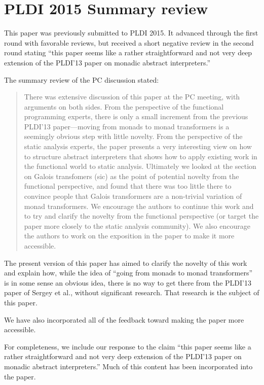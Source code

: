 \documentclass[nocopyrightspace,preprint,10pt]{sigplanconf}
\begin{document}
\balance



\appendix
\section{PLDI 2015 Summary review}

This paper was previously submitted to PLDI 2015. It advanced through
the first round with favorable reviews, but received a short negative
review in the second round stating ``this paper seems like a rather
straightforward and not very deep extension of the PLDI'13 paper on
monadic abstract interpreters.''

The summary review of the PC discussion stated:

\begin{quote}
There was extensive discussion of this paper at the PC meeting, with
arguments on both sides. From the perspective of the functional
programming experts, there is only a small increment from the previous
PLDI'13 paper---moving from monads to monad transformers is a
seemingly obvious step with little novelty. From the perspective of
the static analysis experts, the paper presents a very interesting
view on how to structure abstract interpreters that shows how to apply
existing work in the functional world to static analysis. Ultimately
we looked at the section on Galois transfomers (sic) as the point of
potential novelty from the functional perspective, and found that
there was too little there to convince people that Galois transformers
are a non-trivial variation of monad transformers. We encourage the
authors to continue this work and to try and clarify the novelty from
the functional perspective (or target the paper more closely to the
static analysis community). We also encourage the authors to work on
the exposition in the paper to make it more accessible.
\end{quote}

The present version of this paper has aimed to clarify the novelty of
this work and explain how, while the idea of ``going from monads to
monad transformers'' is in some sense an obvious idea, there is no way
to get there from the PLDI'13 paper of Sergey et al., without
significant research.  That research is the subject of this paper.

We have also incorporated all of the feedback toward making the paper
more accessible.

For completeness, we include our response to the claim ``this paper
seems like a rather straightforward and not very deep extension of the
PLDI'13 paper on monadic abstract interpreters.''  Much of this
content has been incorporated into the paper.
\end{document}
